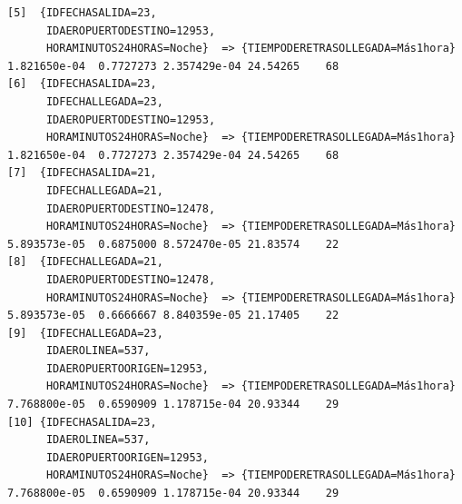 \documentclass{article}
\begin{document}
\begin{lstlisting}
[5]  {IDFECHASALIDA=23,                                                                                                  
      IDAEROPUERTODESTINO=12953,                                                                                         
      HORAMINUTOS24HORAS=Noche}  => {TIEMPODERETRASOLLEGADA=Más1hora} 1.821650e-04  0.7727273 2.357429e-04 24.54265    68
[6]  {IDFECHASALIDA=23,                                                                                                  
      IDFECHALLEGADA=23,                                                                                                 
      IDAEROPUERTODESTINO=12953,                                                                                         
      HORAMINUTOS24HORAS=Noche}  => {TIEMPODERETRASOLLEGADA=Más1hora} 1.821650e-04  0.7727273 2.357429e-04 24.54265    68
[7]  {IDFECHASALIDA=21,                                                                                                  
      IDFECHALLEGADA=21,                                                                                                 
      IDAEROPUERTODESTINO=12478,                                                                                         
      HORAMINUTOS24HORAS=Noche}  => {TIEMPODERETRASOLLEGADA=Más1hora} 5.893573e-05  0.6875000 8.572470e-05 21.83574    22
[8]  {IDFECHALLEGADA=21,                                                                                                 
      IDAEROPUERTODESTINO=12478,                                                                                         
      HORAMINUTOS24HORAS=Noche}  => {TIEMPODERETRASOLLEGADA=Más1hora} 5.893573e-05  0.6666667 8.840359e-05 21.17405    22
[9]  {IDFECHALLEGADA=23,                                                                                                 
      IDAEROLINEA=537,                                                                                                   
      IDAEROPUERTOORIGEN=12953,                                                                                          
      HORAMINUTOS24HORAS=Noche}  => {TIEMPODERETRASOLLEGADA=Más1hora} 7.768800e-05  0.6590909 1.178715e-04 20.93344    29
[10] {IDFECHASALIDA=23,                                                                                                  
      IDAEROLINEA=537,                                                                                                   
      IDAEROPUERTOORIGEN=12953,                                                                                          
      HORAMINUTOS24HORAS=Noche}  => {TIEMPODERETRASOLLEGADA=Más1hora} 7.768800e-05  0.6590909 1.178715e-04 20.93344    29
\end{lstlisting}
\end{document}
